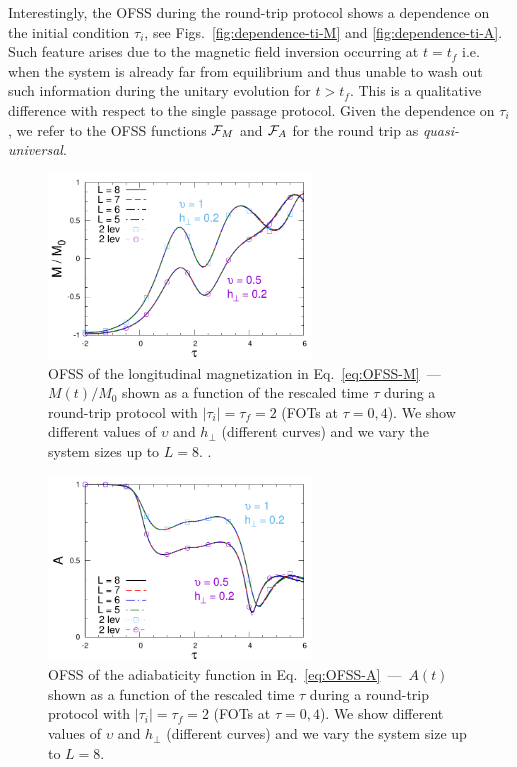 Interestingly, the OFSS during the round-trip protocol shows a dependence on the initial condition $\tau_i$, see Figs.~\ref{fig:dependence-ti-M} and \ref{fig:dependence-ti-A}. Such feature arises due to the magnetic field inversion occurring at $t=t_f$ i.e. when the system is already far from equilibrium and thus unable to wash out such information during the unitary evolution for $t>t_f$. This is a qualitative difference with respect to the single passage protocol. Given the dependence on $\tau_i$, we refer to the OFSS functions ${\cal F}_M$ and ${\cal F}_A$  for the round trip as {\it quasi-universal}.\\
\begin{figure}[t]
\centering
\includegraphics[width=7cm]{imm/tripMt2u05g02-new.pdf}
\caption{OFSS of the longitudinal magnetization in Eq.~\eqref{eq:OFSS-M}~---~$M(t)/M_0$ shown as a function of the rescaled time $\tau$ during a round-trip protocol with $|\tau _i|=\tau_f= 2$ (FOTs at $\tau=0,4$). We show different values of $\upsilon$ and $h_\perp$ (different curves) and we vary the system sizes up to $L = 8$. .}
\label{LongMagn}
\end{figure}
	\begin{figure}[t]
\centering
		\includegraphics[width=7cm]{imm/tripAt2u05g02-new.pdf}
		\caption{OFSS  of the adiabaticity function in Eq.~\eqref{eq:OFSS-A}~---~$A(t)$ shown as a function of the rescaled time $\tau$ during a round-trip protocol with $|\tau_i|=\tau_f =2$ (FOTs at $\tau=0,4$). We show different values of $\upsilon $ and $h_\perp$ (different curves) and we vary the system size up to $L = 8$.  }
		\label{AtripAt2u05g02}
	\end{figure}	
